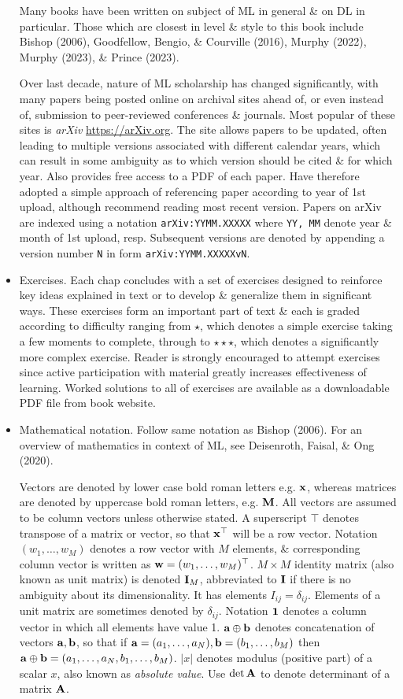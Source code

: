 \documentclass{article}
\begin{document}
\begin{itemize}
	Many books have been written on subject of ML in general \& on DL in particular. Those which are closest in level \& style to this book include Bishop (2006), Goodfellow, Bengio, \& Courville (2016), Murphy (2022), Murphy (2023), \& Prince (2023).
	
	Over last decade, nature of ML scholarship has changed significantly, with many papers being posted online on archival sites ahead of, or even instead of, submission to peer-reviewed conferences \& journals. Most popular of these sites is {\it arXiv} \url{https://arXiv.org}. The site allows papers to be updated, often leading to multiple versions associated with different calendar years, which can result in some ambiguity as to which version should be cited \& for which year. Also provides free access to a PDF of each paper. Have therefore adopted a simple approach of referencing paper according to year of 1st upload, although recommend reading most recent version. Papers on arXiv are indexed using a notation {\tt arXiv:YYMM.XXXXX} where {\tt YY, MM} denote year \& month of 1st upload, resp. Subsequent versions are denoted by appending a version number {\tt N} in form {\tt arXiv:YYMM.XXXXXvN}.
	\item {\sf Exercises.} Each chap concludes with a set of exercises designed to reinforce key ideas explained in text or to develop \& generalize them in significant ways. These exercises form an important part of text \& each is graded according to difficulty ranging from $\star$, which denotes a simple exercise taking a few moments to complete, through to $\star\star\star$, which denotes a significantly more complex exercise. Reader is strongly encouraged to attempt exercises since active participation with material greatly increases effectiveness of learning. Worked solutions to all of exercises are available as a downloadable PDF file from book website.
	\item {\sf Mathematical notation.} Follow same notation as Bishop (2006). For an overview of mathematics in context of ML, see Deisenroth, Faisal, \& Ong (2020).
	
	Vectors are denoted by lower case bold roman letters e.g. ${\bf x}$, whereas matrices are denoted by uppercase bold roman letters, e.g. ${\bf M}$. All vectors are assumed to be column vectors unless otherwise stated. A superscript $\top$ denotes transpose of a matrix or vector, so that ${\bf x}^\top$ will be a row vector. Notation $(w_1,\ldots,w_M)$ denotes a row vector with $M$ elements, \& corresponding column vector is written as ${\bf w} = (w_1,\ldots,w_M)^\top$. $M\times M$ identity matrix (also known as unit matrix) is denoted ${\bf I}_M$, abbreviated to ${\bf I}$ if there is no ambiguity about its dimensionality. It has elements $I_{ij} = \delta_{ij}$. Elements of a unit matrix are sometimes denoted by $\delta_{ij}$. Notation ${\bf1}$ denotes a column vector in which all elements have value 1. ${\bf a}\oplus{\bf b}$ denotes concatenation of vectors ${\bf a},{\bf b}$, so that if ${\bf a} = (a_1,\ldots,a_N),{\bf b} = (b_1,\ldots,b_M)$ then ${\bf a}\oplus{\bf b} = (a_1,\ldots,a_N,b_1,\ldots,b_M)$. $|x|$ denotes modulus (positive part) of a scalar $x$, also known as {\it absolute value}. Use $\det{\bf A}$ to denote determinant of a matrix ${\bf A}$.
	

\end{itemize}
\end{document}
